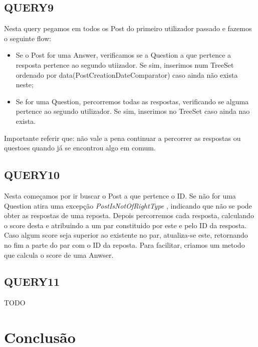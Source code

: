 \documentclass[letterpaper, 10 pt, conference]{IEEEtran}  %
\begin{document}
\subsection{QUERY9}

Nesta query pegamos em todos os Post do primeiro utilizador passado e fazemos o seguinte flow:
\begin{itemize}
    \item Se o Post for uma Answer, verificamos se a Question a que pertence a resposta pertence ao segundo utiizador. Se sim,
    inserimos num TreeSet ordenado por data(PostCreationDateComparator) caso ainda não exista neste;
    \item Se for uma Question, percorremos todas as respostas, verificando se alguma pertence ao segundo utilizador. Se sim, inserimos
    no TreeSet caso ainda nao exista.
\end{itemize}
    Importante referir que: não vale a pena continuar a percorrer as respostas ou questoes quando já se encontrou algo em comum.


\subsection{QUERY10}

Nesta começamos por ir buscar o Post a que pertence o ID. Se não for uma Question atira uma excepção \textit{PostIsNotOfRightType}
, indicando que não se pode obter as respostas de uma reposta.
Depois percorremos cada resposta, calculando o score desta e atribuindo a um par constituido por este e pelo ID da resposta.
Caso algum score seja superior ao existente no par, atualiza-se este, retornando no fim a parte do par com o ID da reposta.
Para facilitar, criamos um metodo que calcula o score de uma Anwser.

\subsection{QUERY11}

TODO

\section{Conclusão}
\end{document}
